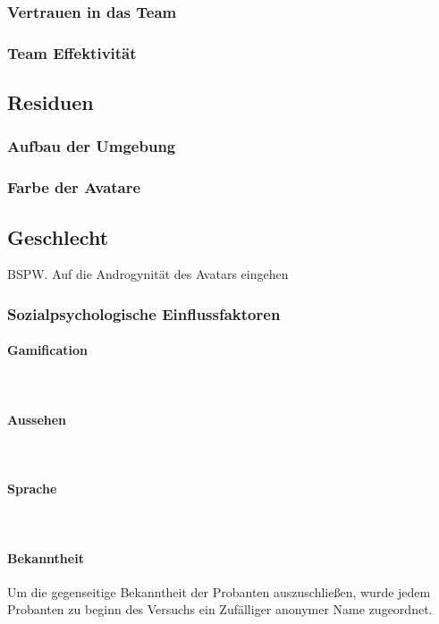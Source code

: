 \documentclass[a4paper,11pt]{article}%
\renewcommand{\\}{\vspace*{0.5\baselineskip} \newline}
\begin{document}
			\subsubsection{Vertrauen in das Team}
			\subsubsection{Team Effektivität}
			
\subsection{Residuen}
			\subsubsection{Aufbau der Umgebung}
			\subsubsection{Farbe der Avatare}
			\subsection{Geschlecht}
			BSPW. Auf die Androgynität des Avatars eingehen
			\subsubsection{Sozialpsychologische Einflussfaktoren}
				\paragraph{Gamification} $~$ \\
				\paragraph{Aussehen} $~$ \\
				\paragraph{Sprache} $~$ \\	
				\paragraph{Bekanntheit}
Um die gegenseitige Bekanntheit der Probanten auszuschließen, wurde jedem Probanten zu beginn des Versuchs ein Zufälliger anonymer Name zugeordnet.
			
\end{document}
